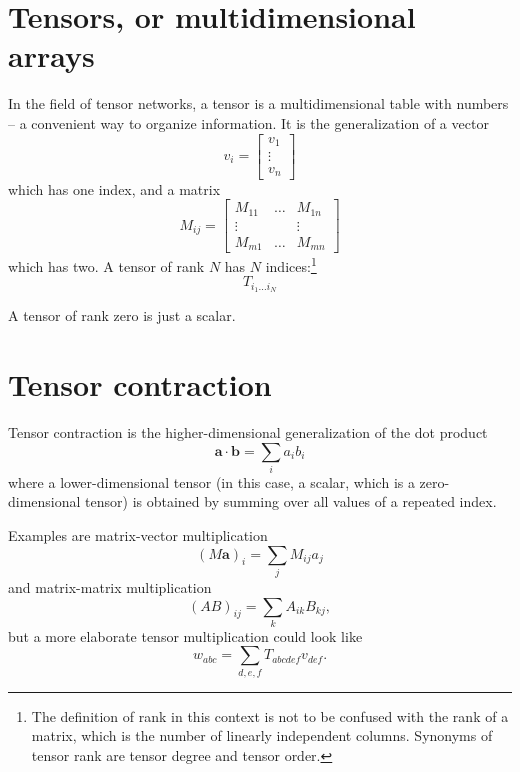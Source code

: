 \section{Tensors, or multidimensional arrays}


In the field of tensor networks, a tensor is a multidimensional table with numbers -- a
convenient way to organize information. It is the generalization of a vector
\begin{equation}
  v_i =
  \begin{bmatrix}
    v_1 \\
    \vdots \\
    v_n
  \end{bmatrix}
\end{equation}
which has one index, and a matrix
\begin{equation}
  M_{i j} =
  \begin{bmatrix}
  M_{1 1} & \dots & M_{1 n} \\
  \vdots  & & \vdots \\
  M_{m 1} & \dots & M_{m n}
  \end{bmatrix}
\end{equation}
which has two.
A tensor of rank $N$ has $N$ indices:\footnote{The definition of rank in this
context is not to be confused with the rank of a matrix, which is the number of
linearly independent columns. Synonyms of tensor rank are tensor degree and
tensor order.}
\begin{equation}
  T_{i_1 \dots i_N}
\end{equation}

A tensor of rank zero is just a scalar.

\section{Tensor contraction}

Tensor contraction is the higher-dimensional generalization of the dot product
\begin{equation}
  \bm{a} \cdot \bm{b} = \sum_i a_i b_i
\end{equation}
where a lower-dimensional tensor (in this case, a scalar, which is a
zero-dimensional tensor) is obtained by summing over all values of a repeated
index.

Examples are matrix-vector multiplication
\begin{equation}
  (M \bm{a})_{i} = \sum_j M_{i j} a_j
\end{equation}
and matrix-matrix multiplication
\begin{equation}
  (A B)_{i j} = \sum_k A_{i k} B_{k j},
\end{equation}
but a more elaborate tensor multiplication could look like
\begin{equation}
  w_{a b c} = \sum_{d, e, f} T_{a b c d e f} v_{d e f}.
\end{equation}

